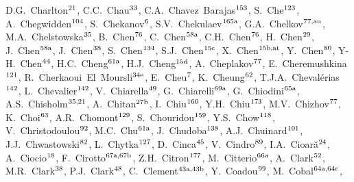 \begin{flushleft}
D.G.~Charlton$^\textrm{\scriptsize 21}$,    
C.C.~Chau$^\textrm{\scriptsize 33}$,    
C.A.~Chavez~Barajas$^\textrm{\scriptsize 153}$,    
S.~Che$^\textrm{\scriptsize 123}$,    
A.~Chegwidden$^\textrm{\scriptsize 104}$,    
S.~Chekanov$^\textrm{\scriptsize 6}$,    
S.V.~Chekulaev$^\textrm{\scriptsize 165a}$,    
G.A.~Chelkov$^\textrm{\scriptsize 77,au}$,    
M.A.~Chelstowska$^\textrm{\scriptsize 35}$,    
B.~Chen$^\textrm{\scriptsize 76}$,    
C.~Chen$^\textrm{\scriptsize 58a}$,    
C.H.~Chen$^\textrm{\scriptsize 76}$,    
H.~Chen$^\textrm{\scriptsize 29}$,    
J.~Chen$^\textrm{\scriptsize 58a}$,    
J.~Chen$^\textrm{\scriptsize 38}$,    
S.~Chen$^\textrm{\scriptsize 134}$,    
S.J.~Chen$^\textrm{\scriptsize 15c}$,    
X.~Chen$^\textrm{\scriptsize 15b,at}$,    
Y.~Chen$^\textrm{\scriptsize 80}$,    
Y-H.~Chen$^\textrm{\scriptsize 44}$,    
H.C.~Cheng$^\textrm{\scriptsize 61a}$,    
H.J.~Cheng$^\textrm{\scriptsize 15d}$,    
A.~Cheplakov$^\textrm{\scriptsize 77}$,    
E.~Cheremushkina$^\textrm{\scriptsize 121}$,    
R.~Cherkaoui~El~Moursli$^\textrm{\scriptsize 34e}$,    
E.~Cheu$^\textrm{\scriptsize 7}$,    
K.~Cheung$^\textrm{\scriptsize 62}$,    
T.J.A.~Cheval\'erias$^\textrm{\scriptsize 142}$,    
L.~Chevalier$^\textrm{\scriptsize 142}$,    
V.~Chiarella$^\textrm{\scriptsize 49}$,    
G.~Chiarelli$^\textrm{\scriptsize 69a}$,    
G.~Chiodini$^\textrm{\scriptsize 65a}$,    
A.S.~Chisholm$^\textrm{\scriptsize 35,21}$,    
A.~Chitan$^\textrm{\scriptsize 27b}$,    
I.~Chiu$^\textrm{\scriptsize 160}$,    
Y.H.~Chiu$^\textrm{\scriptsize 173}$,    
M.V.~Chizhov$^\textrm{\scriptsize 77}$,    
K.~Choi$^\textrm{\scriptsize 63}$,    
A.R.~Chomont$^\textrm{\scriptsize 129}$,    
S.~Chouridou$^\textrm{\scriptsize 159}$,    
Y.S.~Chow$^\textrm{\scriptsize 118}$,    
V.~Christodoulou$^\textrm{\scriptsize 92}$,    
M.C.~Chu$^\textrm{\scriptsize 61a}$,    
J.~Chudoba$^\textrm{\scriptsize 138}$,    
A.J.~Chuinard$^\textrm{\scriptsize 101}$,    
J.J.~Chwastowski$^\textrm{\scriptsize 82}$,    
L.~Chytka$^\textrm{\scriptsize 127}$,    
D.~Cinca$^\textrm{\scriptsize 45}$,    
V.~Cindro$^\textrm{\scriptsize 89}$,    
I.A.~Cioar\u{a}$^\textrm{\scriptsize 24}$,    
A.~Ciocio$^\textrm{\scriptsize 18}$,    
F.~Cirotto$^\textrm{\scriptsize 67a,67b}$,    
Z.H.~Citron$^\textrm{\scriptsize 177}$,    
M.~Citterio$^\textrm{\scriptsize 66a}$,    
A.~Clark$^\textrm{\scriptsize 52}$,    
M.R.~Clark$^\textrm{\scriptsize 38}$,    
P.J.~Clark$^\textrm{\scriptsize 48}$,    
C.~Clement$^\textrm{\scriptsize 43a,43b}$,    
Y.~Coadou$^\textrm{\scriptsize 99}$,    
M.~Cobal$^\textrm{\scriptsize 64a,64c}$,    

\end{flushleft}
